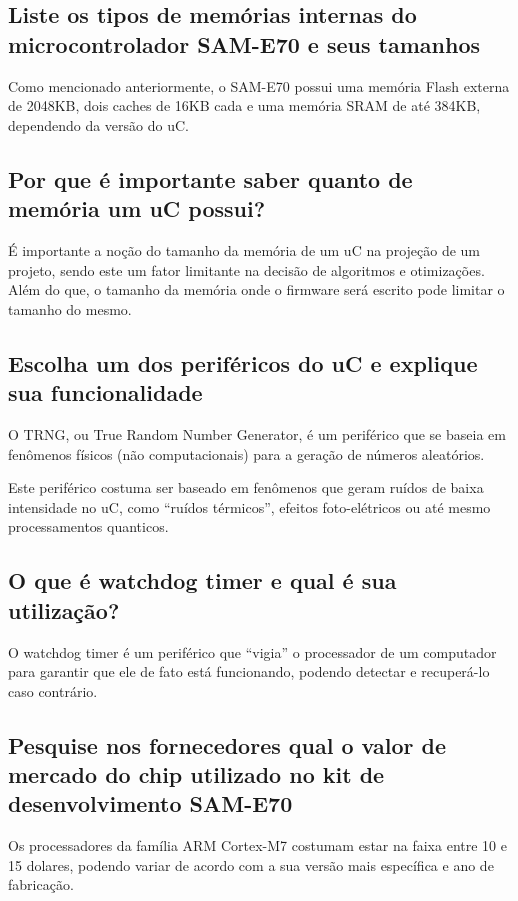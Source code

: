 \documentclass[11pt]{article}
\begin{document}
  \subsection{Liste os tipos de memórias internas do microcontrolador
    SAM-E70 e seus tamanhos}
\label{sec:orgheadline4}
  Como mencionado anteriormente, o SAM-E70 possui uma memória Flash externa de
  2048KB, dois caches de 16KB cada e uma memória SRAM de até 384KB, dependendo
  da versão do uC.

  \subsection{Por que é importante saber quanto de memória um uC
    possui?}
\label{sec:orgheadline4}
  É importante a noção do tamanho da memória de um uC na projeção de um projeto,
  sendo este um fator limitante na decisão de algoritmos e otimizações. Além do
  que, o tamanho da memória onde o firmware será escrito pode limitar o tamanho
  do mesmo.

  \subsection{Escolha um dos periféricos do uC e explique sua funcionalidade}
\label{sec:orgheadline4}
  O TRNG, ou True Random Number Generator, é um periférico que se baseia em
  fenômenos físicos (não computacionais) para a geração de números aleatórios.

  Este periférico costuma ser baseado em fenômenos que geram ruídos de baixa
  intensidade no uC, como ``ruídos térmicos'', efeitos foto-elétricos ou até
  mesmo processamentos quanticos.

  \subsection{O que é watchdog timer e qual é sua utilização?}
\label{sec:orgheadline4}
  O watchdog timer é um periférico que ``vigia'' o processador de um computador
  para garantir que ele de fato está funcionando, podendo detectar e recuperá-lo
  caso contrário.

  \subsection{Pesquise nos fornecedores qual o valor de mercado do chip
    utilizado no kit de desenvolvimento SAM-E70}
\label{sec:orgheadline4}
  Os processadores da família ARM Cortex-M7 costumam estar na faixa entre 10 e
  15 dolares, podendo variar de acordo com a sua versão mais específica e ano de fabricação.
\end{document}
